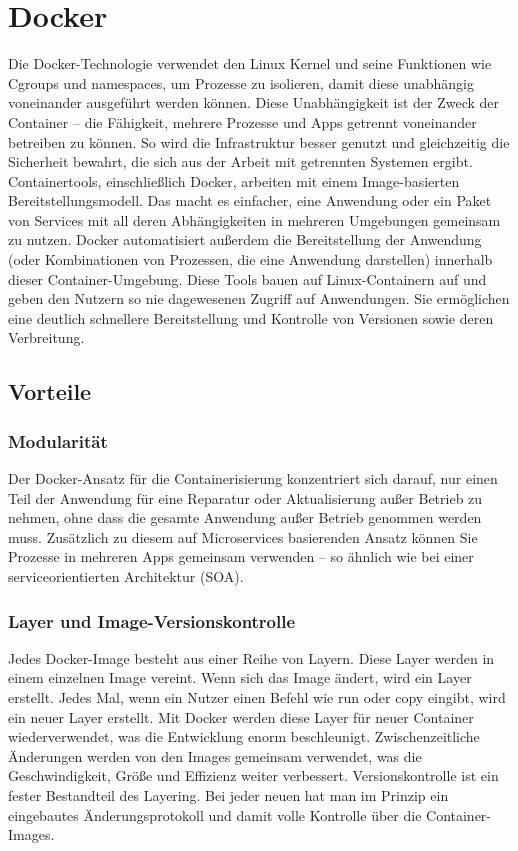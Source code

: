 \section{Docker}

Die Docker-Technologie verwendet den Linux Kernel und seine Funktionen wie Cgroups und namespaces, um Prozesse zu isolieren, damit diese unabhängig voneinander ausgeführt werden können. 
Diese Unabhängigkeit ist der Zweck der Container – die Fähigkeit, mehrere Prozesse und Apps getrennt voneinander betreiben zu können. 
So wird die Infrastruktur besser genutzt und gleichzeitig die Sicherheit bewahrt, die sich aus der Arbeit mit getrennten Systemen ergibt.
Containertools, einschließlich Docker, arbeiten mit einem Image-basierten Bereitstellungsmodell. Das macht es einfacher, eine Anwendung oder ein Paket von Services mit all deren 
Abhängigkeiten in mehreren Umgebungen gemeinsam zu nutzen. Docker automatisiert außerdem die Bereitstellung der Anwendung 
(oder Kombinationen von Prozessen, die eine Anwendung darstellen) innerhalb dieser Container-Umgebung. Diese Tools bauen auf Linux-Containern auf 
und geben den Nutzern so nie dagewesenen Zugriff auf Anwendungen. Sie ermöglichen eine deutlich schnellere Bereitstellung und Kontrolle von Versionen sowie deren Verbreitung.
\cite{sysarch-docker-1}

\subsection{Vorteile}

\subsubsection{Modularität}

Der Docker-Ansatz für die Containerisierung konzentriert sich darauf, nur einen Teil der Anwendung für eine Reparatur oder Aktualisierung außer Betrieb zu nehmen, 
ohne dass die gesamte Anwendung außer Betrieb genommen werden muss. Zusätzlich zu diesem auf Microservices basierenden Ansatz können Sie Prozesse 
in mehreren Apps gemeinsam verwenden – so ähnlich wie bei einer serviceorientierten Architektur (SOA).
\cite{sysarch-docker-1}

\subsubsection{Layer und Image-Versionskontrolle}

Jedes Docker-Image besteht aus einer Reihe von Layern. Diese Layer werden in einem einzelnen Image vereint. Wenn sich das Image ändert, wird ein Layer erstellt. 
Jedes Mal, wenn ein Nutzer einen Befehl wie run oder copy eingibt, wird ein neuer Layer erstellt. Mit Docker werden diese Layer für neuer Container wiederverwendet, 
was die Entwicklung enorm beschleunigt. Zwischenzeitliche Änderungen werden von den Images gemeinsam verwendet, was die Geschwindigkeit, Größe und Effizienz weiter verbessert. 
Versionskontrolle ist ein fester Bestandteil des Layering. Bei jeder neuen hat man im Prinzip ein eingebautes Änderungsprotokoll und damit volle Kontrolle über die Container-Images.
\cite{sysarch-docker-1}


